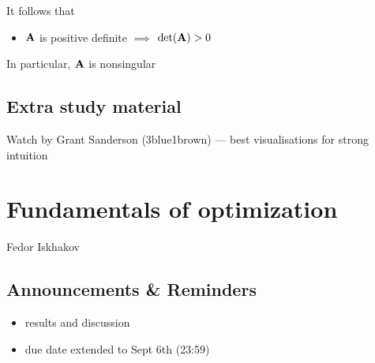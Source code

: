 \documentclass[letterpaper,10pt,english]{jupyterBook}
\begin{document}
\sphinxAtStartPar
It follows that
\begin{itemize}
\item {} 
\sphinxAtStartPar
\({\bf A}\) is positive definite \(\implies\) \(\det({\bf A}) > 0\)

\end{itemize}

\sphinxAtStartPar
In particular, \({\bf A}\) is nonsingular


\section{Extra study material}
\label{\detokenize{05.linear_algebra:extra-study-material}}\label{\detokenize{05.linear_algebra:id1}}
\sphinxAtStartPar
Watch  by Grant Sanderson (3blue1brown) — best visualisations for strong intuition

\sphinxstepscope


\chapter{Fundamentals of optimization}
\label{\detokenize{06.optimization_fundamentals:fundamentals-of-optimization}}\label{\detokenize{06.optimization_fundamentals::doc}}
\sphinxAtStartPar
{}
Fedor Iskhakov


\section{Announcements \& Reminders}
\label{\detokenize{06.optimization_fundamentals:announcements-reminders}}\begin{itemize}
\item {} 
\sphinxAtStartPar
{} results and discussion

\item {} 
\sphinxAtStartPar
{} due date extended to Sept 6th (23:59)

\end{itemize}
\end{document}
